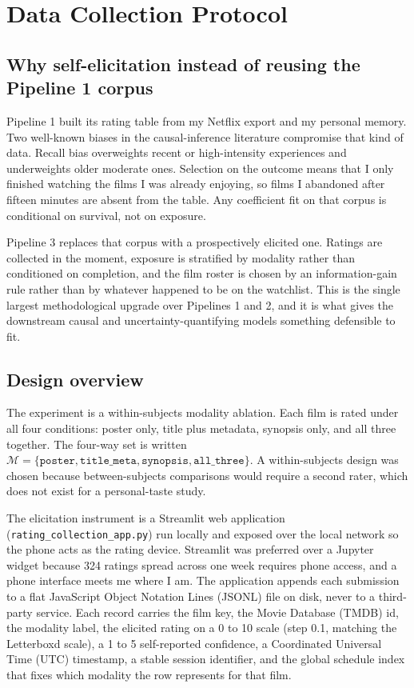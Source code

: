 \documentclass{article}
\begin{document}
\section{Data Collection Protocol}
\label{sec:data}

\subsection{Why self-elicitation instead of reusing the Pipeline 1 corpus}

Pipeline 1 built its rating table from my Netflix export and my personal memory. Two well-known biases in the causal-inference literature compromise that kind of data. Recall bias overweights recent or high-intensity experiences and underweights older moderate ones. Selection on the outcome means that I only finished watching the films I was already enjoying, so films I abandoned after fifteen minutes are absent from the table. Any coefficient fit on that corpus is conditional on survival, not on exposure.

Pipeline 3 replaces that corpus with a prospectively elicited one. Ratings are collected in the moment, exposure is stratified by modality rather than conditioned on completion, and the film roster is chosen by an information-gain rule rather than by whatever happened to be on the watchlist. This is the single largest methodological upgrade over Pipelines 1 and 2, and it is what gives the downstream causal and uncertainty-quantifying models something defensible to fit.

\subsection{Design overview}

The experiment is a within-subjects modality ablation. Each film is rated under all four conditions: poster only, title plus metadata, synopsis only, and all three together. The four-way set is written $\mathcal{M} = \{\texttt{poster}, \texttt{title\_meta}, \texttt{synopsis}, \texttt{all\_three}\}$. A within-subjects design was chosen because between-subjects comparisons would require a second rater, which does not exist for a personal-taste study.

The elicitation instrument is a Streamlit web application (\texttt{rating\_collection\_app.py}) run locally and exposed over the local network so the phone acts as the rating device. Streamlit was preferred over a Jupyter widget because 324 ratings spread across one week requires phone access, and a phone interface meets me where I am. The application appends each submission to a flat JavaScript Object Notation Lines (JSONL) file on disk, never to a third-party service. Each record carries the film key, the Movie Database (TMDB) id, the modality label, the elicited rating on a 0 to 10 scale (step 0.1, matching the Letterboxd scale), a 1 to 5 self-reported confidence, a Coordinated Universal Time (UTC) timestamp, a stable session identifier, and the global schedule index that fixes which modality the row represents for that film.
\end{document}
